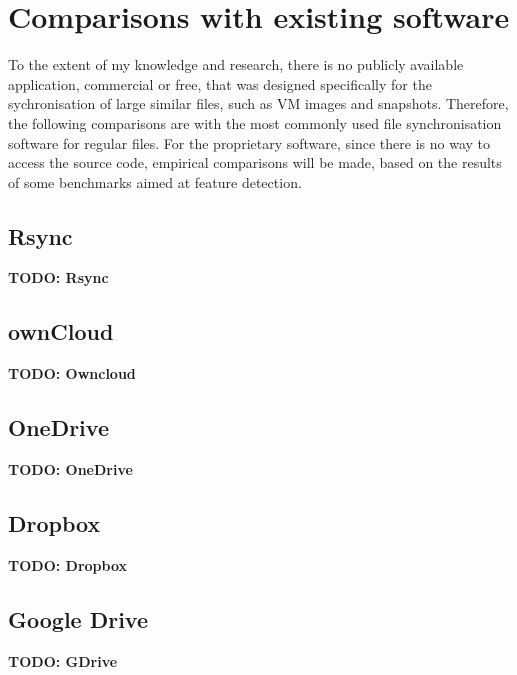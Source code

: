 
\chapter{Comparisons with existing software}


To the extent of my knowledge and research, there is no publicly available application, commercial or free, that was designed specifically for the sychronisation of large similar files, such as VM images and snapshots. Therefore, the following comparisons are with the most commonly used file synchronisation software for regular files. For the proprietary software, since there is no way to access the source code, empirical comparisons will be made, based on the results of some benchmarks aimed at feature detection.

\section{Rsync}
  {\color{red}\textbf{TODO: Rsync}}
\section{ownCloud}
  {\color{red}\textbf{TODO: Owncloud}}
\section{OneDrive}
  {\color{red}\textbf{TODO: OneDrive}}
\section{Dropbox}
  {\color{red}\textbf{TODO: Dropbox}}
\section{Google Drive}
  {\color{red}\textbf{TODO: GDrive}}
